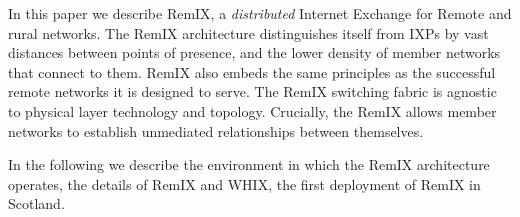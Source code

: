 In this paper we describe RemIX, a \emph{distributed} Internet Exchange for
Remote and rural networks. The RemIX architecture distinguishes itself
from \acp{IXP} 
 by vast distances between points of presence, and the lower density
of member networks that connect to them. RemIX also embeds the same
principles as the successful remote networks it is designed to serve.
The RemIX switching fabric is agnostic to physical layer technology and
topology.
Crucially, the RemIX
allows member networks to establish unmediated relationships between
themselves.

In the following we describe the environment in which the  RemIX architecture operates, the details of RemIX and   WHIX, the first deployment of RemIX  in Scotland.
